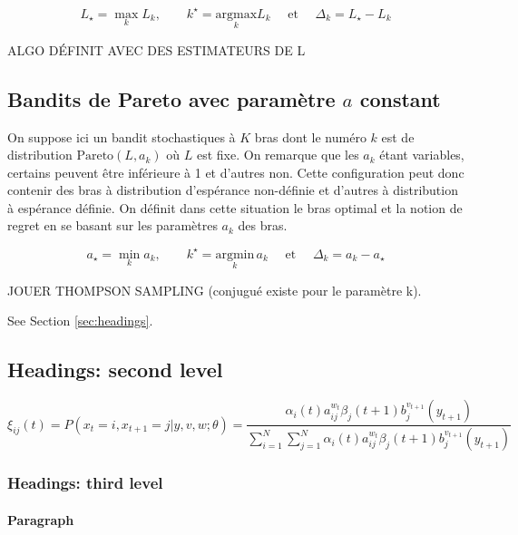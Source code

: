 \documentclass{article}
\begin{document}
\begin{equation*}
L_{\star}=\max_{k} L_k,\qquad k^{\star}=\underset{k}{\mathrm{argmax}} L_k \quad \text{ et } \quad  \Delta_k = L_{\star}-L_k
\end{equation*}

ALGO DÉFINIT AVEC DES ESTIMATEURS DE L


\subsection{Bandits de Pareto avec paramètre $a$ constant}
On suppose ici un bandit stochastiques à $K$ bras dont le numéro $k$ est de distribution $\mathrm{Pareto}(L,a_k)$ où $L$ est fixe. On remarque que les $a_k$ étant variables, certains peuvent être inférieure à 1 et d'autres non. Cette configuration peut donc contenir des bras à distribution d'espérance non-définie et d'autres à distribution à espérance définie. On définit dans cette situation le bras optimal et la notion de regret en se basant sur les paramètres $a_k$ des bras.

\begin{equation*}
a_{\star}=\min_{k} a_k,\qquad k^{\star}=\underset{k}{\mathrm{argmin}}\,a_k \quad \text{ et } \quad \Delta_k = a_k-a_{\star}
\end{equation*}

JOUER THOMPSON SAMPLING (conjugué existe pour le paramètre k).

\label{sec:headings}

\lipsum[4] See Section \ref{sec:headings}.

\subsection{Headings: second level}
\lipsum[5]
\begin{equation}
	\xi _{ij}(t)=P(x_{t}=i,x_{t+1}=j|y,v,w;\theta)= {\frac {\alpha _{i}(t)a^{w_t}_{ij}\beta _{j}(t+1)b^{v_{t+1}}_{j}(y_{t+1})}{\sum _{i=1}^{N} \sum _{j=1}^{N} \alpha _{i}(t)a^{w_t}_{ij}\beta _{j}(t+1)b^{v_{t+1}}_{j}(y_{t+1})}}
\end{equation}

\subsubsection{Headings: third level}
\lipsum[6]

\paragraph{Paragraph}
\lipsum[7]
\end{document}
